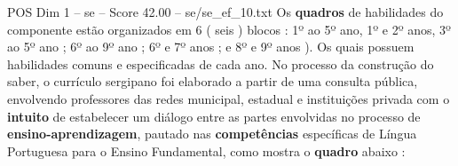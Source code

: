 \begin{textsample}{POS Dim 1 – se – Score 42.00 – se/se\_ef\_10.txt}
Os \textbf{quadros} de habilidades do componente estão organizados em 6 ( seis ) blocos : 1º ao 5º ano, 1º e 2º anos, 3º ao 5º ano ; 6º ao 9º ano ; 6º e 7º anos ; e 8º e 9º anos ).
Os quais possuem habilidades comuns e especificadas de cada ano.
No processo da construção do saber, o currículo sergipano foi elaborado a partir de uma consulta pública, envolvendo professores das redes municipal, estadual e instituições privada com o \textbf{intuito} de estabelecer um diálogo entre as partes envolvidas no processo de \textbf{ensino-aprendizagem}, pautado nas \textbf{competências} específicas de Língua Portuguesa para o Ensino Fundamental, como mostra o \textbf{quadro} abaixo :

\end{textsample}
